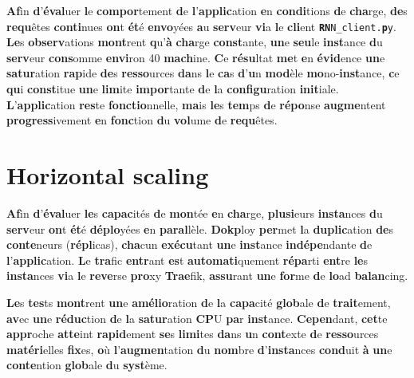 \documentclass{rapportClass} %
\begin{document}
\textbf{Af}in \textbf{d}’\textbf{éval}uer \textbf{l}e \textbf{compor}tement \textbf{d}e \textbf{l}’\textbf{applic}ation \textbf{e}n \textbf{condi}tions \textbf{d}e
\textbf{cha}rge, \textbf{de}s \textbf{requ}êtes \textbf{conti}nues \textbf{on}t \textbf{ét}é \textbf{envo}yées \textbf{a}u \textbf{serv}eur \textbf{vi}a \textbf{l}e
\textbf{cli}ent \texttt{\textbf{RN}N_client.\textbf{p}y}.
\textbf{Le}s \textbf{observ}ations \textbf{mont}rent \textbf{q}u’\textbf{à} \textbf{cha}rge \textbf{const}ante, \textbf{un}e \textbf{seu}le \textbf{inst}ance \textbf{d}u
\textbf{serv}eur \textbf{cons}omme \textbf{envi}ron 40%
\textbf{mach}ine.
\textbf{C}e \textbf{résu}ltat \textbf{me}t \textbf{e}n \textbf{évid}ence \textbf{un}e \textbf{satur}ation \textbf{rap}ide \textbf{de}s \textbf{resso}urces \textbf{da}ns
\textbf{l}e \textbf{ca}s \textbf{d}’\textbf{u}n \textbf{mod}èle \textbf{mo}no-\textbf{inst}ance, \textbf{c}e \textbf{qu}i \textbf{const}itue \textbf{un}e \textbf{lim}ite
\textbf{impor}tante \textbf{d}e \textbf{l}a \textbf{configu}ration \textbf{init}iale.
\textbf{L}’\textbf{applic}ation \textbf{res}te \textbf{fonctio}nnelle, \textbf{ma}is \textbf{le}s \textbf{tem}ps \textbf{d}e \textbf{répo}nse
\textbf{augme}ntent \textbf{progress}ivement \textbf{e}n \textbf{fonc}tion \textbf{d}u \textbf{vol}ume \textbf{d}e \textbf{requ}êtes.

\section{Horizontal scaling}

\textbf{Af}in \textbf{d}’\textbf{éval}uer \textbf{le}s \textbf{capac}ités \textbf{d}e \textbf{mon}tée \textbf{e}n \textbf{cha}rge, \textbf{plusi}eurs \textbf{insta}nces
\textbf{d}u \textbf{serv}eur \textbf{on}t \textbf{ét}é \textbf{déplo}yées \textbf{e}n \textbf{paral}lèle.
\textbf{Dokp}loy \textbf{per}met \textbf{l}a \textbf{duplic}ation \textbf{de}s \textbf{conte}neurs (\textbf{répl}icas), \textbf{cha}cun
\textbf{exécu}tant \textbf{un}e \textbf{inst}ance \textbf{indépe}ndante \textbf{d}e \textbf{l}’\textbf{applic}ation.
\textbf{L}e \textbf{tra}fic \textbf{entr}ant \textbf{es}t \textbf{automati}quement \textbf{répa}rti \textbf{ent}re \textbf{le}s \textbf{insta}nces \textbf{vi}a
\textbf{l}e \textbf{reve}rse \textbf{pro}xy \textbf{Trae}fik, \textbf{assu}rant \textbf{un}e \textbf{for}me \textbf{d}e \textbf{lo}ad \textbf{balan}cing.

\textbf{Le}s \textbf{tes}ts \textbf{mont}rent \textbf{un}e \textbf{amélio}ration \textbf{d}e \textbf{l}a \textbf{capa}cité \textbf{glob}ale \textbf{d}e
\textbf{trait}ement, \textbf{av}ec \textbf{un}e \textbf{réduc}tion \textbf{d}e \textbf{l}a \textbf{satur}ation \textbf{CP}U \textbf{pa}r \textbf{inst}ance.
\textbf{Cepen}dant, \textbf{cet}te \textbf{appr}oche \textbf{atte}int \textbf{rapid}ement \textbf{se}s \textbf{limi}tes \textbf{da}ns \textbf{u}n
\textbf{cont}exte \textbf{d}e \textbf{resso}urces \textbf{matéri}elles \textbf{fix}es, \textbf{o}ù \textbf{l}’\textbf{augmen}tation \textbf{d}u \textbf{nom}bre
\textbf{d}’\textbf{insta}nces \textbf{cond}uit \textbf{à} \textbf{un}e \textbf{conte}ntion \textbf{glob}ale \textbf{d}u \textbf{syst}ème.
\end{document}
